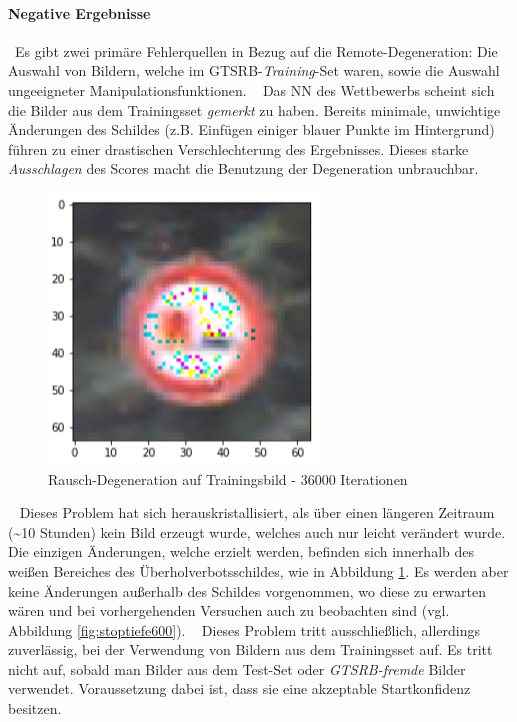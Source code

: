 \paragraph{Negative Ergebnisse} ~\newline Es gibt zwei primäre Fehlerquellen in Bezug auf die Remote-Degeneration: Die Auswahl von Bildern, welche im GTSRB-\textit{Training}-Set waren, sowie die Auswahl ungeeigneter Manipulationsfunktionen. 
~\newline
Das \ac{NN} des Wettbewerbs scheint sich die Bilder aus dem Trainingsset \textit{gemerkt} zu haben. Bereits minimale, unwichtige Änderungen des Schildes (z.B. Einfügen einiger blauer Punkte im Hintergrund) führen zu einer drastischen Verschlechterung des Ergebnisses. Dieses starke \textit{Ausschlagen} des Scores macht die Benutzung der Degeneration unbrauchbar.
\begin{figure}[h]
	\centering
	\includegraphics[width=0.5\linewidth]{Images/DegenSamples/OverFitSmaller}
	\caption[Degeneration overfit]{Rausch-Degeneration auf Trainingsbild - 36000 Iterationen}
	\label{fig:DegenOverfit}
\end{figure}
~\newline
Dieses Problem hat sich herauskristallisiert, als über einen längeren Zeitraum (\textasciitilde  10 Stunden) kein Bild erzeugt wurde, welches auch nur leicht verändert wurde. Die einzigen Änderungen, welche erzielt werden, befinden sich innerhalb des weißen Bereiches des Überholverbotsschildes, wie in Abbildung \ref{fig:DegenOverfit}. Es werden aber keine Änderungen außerhalb des Schildes vorgenommen, wo diese zu erwarten wären und bei vorhergehenden Versuchen auch zu beobachten sind (vgl. Abbildung \ref{fig:stoptiefe600}). 
~\newline
Dieses Problem tritt ausschließlich, allerdings zuverlässig, bei der Verwendung von Bildern aus dem Trainingsset auf. Es tritt nicht auf, sobald man Bilder aus dem Test-Set oder \textit{GTSRB-fremde} Bilder verwendet. Voraussetzung dabei ist, dass sie eine akzeptable Startkonfidenz besitzen. 

